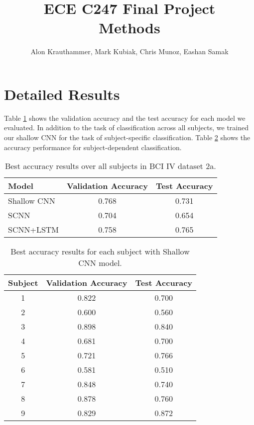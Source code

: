\documentclass{article}
\author{Alon Krauthammer, Mark Kubiak, Chris Munoz, Eashan Samak}
\title{\vspace{-2cm}ECE C247 Final Project\\
Methods}
\begin{document}
\maketitle

\section{Detailed Results}
Table \ref{tab:acc} shows the validation accuracy and the test accuracy for each
model we evaluated. In addition to the task of classification across all
subjects, we trained our shallow CNN for the task of subject-specific
classification. Table \ref{tab:subj} shows the accuracy performance for
subject-dependent classification.

\begin{table}[H]
\small
\begin{center}
    \begin{tabular}{|l|c|c|}
        \hline
        Model           & Validation Accuracy & Test Accuracy   \\
        \hline\hline
        Shallow CNN     & 0.768               & 0.731           \\
        SCNN            & 0.704               & 0.654           \\
        SCNN+LSTM       & 0.758               & 0.765           \\
        \hline
    \end{tabular}
\end{center}
\caption{Best accuracy results over all subjects in BCI IV dataset 2a.}
\label{tab:acc}
\end{table}

\begin{table}[H]
\small
\begin{center}
    \begin{tabular}{|c|c|c|}
        \hline
        Subject & Validation Accuracy   & Test Accuracy \\
        \hline\hline
        1       & 0.822  & 0.700    \\
        2       & 0.600  & 0.560    \\
        3       & 0.898  & 0.840    \\
        4       & 0.681  & 0.700    \\
        5       & 0.721  & 0.766    \\
        6       & 0.581  & 0.510    \\
        7       & 0.848  & 0.740    \\
        8       & 0.878  & 0.760    \\
        9       & 0.829  & 0.872    \\
        \hline
    \end{tabular}
\end{center}
\caption{Best accuracy results for each subject with Shallow CNN model.}
\label{tab:subj}
\end{table}
\end{document}
